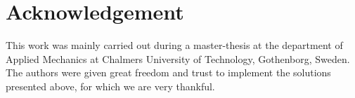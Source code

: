 \documentclass[root.tex]{subfiles}
\begin{document}
{\pagestyle{empty}}
\section{Acknowledgement}
\label{chap:Acknowledgement}
This work was mainly carried out during a master-thesis at the department of Applied Mechanics at Chalmers University of Technology, Gothenborg, Sweden. The authors were given great freedom and trust to implement the solutions presented above, for which we are very thankful. 
\end{document}
